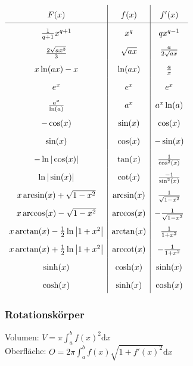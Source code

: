 \documentclass[6pt,a4paper]{scrartcl}
\DeclareMathOperator{\arccot}{arccot}
\begin{document}
\begin{multicols*}{4}
\everymath{\displaystyle}	%
\begin{math}\renewcommand{\arraystretch}{1.8}
\begin{array}{c|c|c}
F(x) & f(x) & f'(x) \\ \hline 
\frac{1}{q+1}x^{q+1} & x^q & qx^{q-1} \\
\raisebox{-0.2em}{$\frac{2\sqrt{ax^3}}{3}$} & \sqrt{ax} & \raisebox{0.2em}{$\frac{a}{2\sqrt{ax}}$}\\
x\ln(ax) -x & \ln(ax) & \textstyle \frac{a}{x}\\
e^x & e^x & e^x \\
\frac{a^x}{\ln(a)} & a^x & a^x \ln(a) \\
-\cos(x) & \sin(x) & \cos(x)\\
\sin(x) & \cos(x) & -\sin(x)\\
-\ln |\cos(x)| & \tan(x) & \frac{1}{\cos^2(x)} \\
\ln |\sin(x)| & \cot(x) & \frac{-1}{\sin^2(x)} \\
x\arcsin (x)+\sqrt{1-x^2} & \arcsin(x) & \frac{1}{\sqrt{1-x^2}}\\
x\arccos (x)-\sqrt{1-x^2} & \arccos(x) & -\frac{1}{\sqrt{1-x^2}}\\
x\arctan (x)-\frac{1}{2} \ln \left| 1+ x^2 \right| & \arctan (x) & \frac{1}{1+x^2} \\
x\arctan (x)+\frac{1}{2} \ln \left| 1+ x^2 \right| & \arccot (x) & -\frac{1}{1+x^2} \\
\sinh(x) & \cosh(x) & \sinh (x) \\
\cosh(x) & \sinh(x) & \cosh (x)\\
\end{array}
\end{math}
\everymath{\textstyle}


\subsubsection{Rotationskörper}
Volumen: $V = \pi \int_a^b f(x)^2 \mathrm dx$\\
Oberfläche: $O = 2 \pi \int_a^b f(x) \sqrt{1 + f'(x)^2} \mathrm dx$


\end{multicols*}
\end{document}
